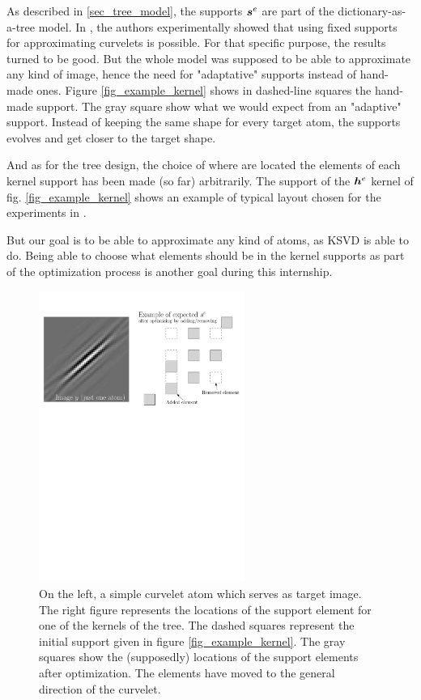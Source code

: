 As described in \ref{sec_tree_model}, the supports $\bm{s}^e$ are part of the dictionary-as-a-tree model. In \cite{chabiron_toward_2015}, the authors experimentally showed that using fixed supports for approximating curvelets is possible. For that specific purpose, the results turned to be good. But the whole model was supposed to be able to approximate any kind of image, hence the need for "adaptative" supports instead of hand-made ones. Figure \ref{fig_example_kernel} shows in dashed-line squares the hand-made support. The gray square show what we would expect from an "adaptive" support. Instead of keeping the same shape for every target atom, the supports evolves and get closer to the target shape.

And as for the tree design, the choice of where are located the elements of each kernel support has been made (so far) arbitrarily. The support of the $\bm{h}^e$ kernel of fig. \ref{fig_example_kernel} shows an example of typical layout chosen for the experiments in \cite{chabiron_optimization_2016}. 

But our goal is to be able to approximate any kind of atoms, as \ac{KSVD} is able to do. Being able to choose what elements should be in the kernel supports as part of the optimization process is another goal during this internship.

\begin{figure}[!ht] \centering
\includegraphics[width=0.6\textwidth]{figures/add-rm-elmts-support.pdf}
\caption{On the left, a simple curvelet atom which serves as target image. The right figure represents the locations of the support element for one of the kernels of the tree. The dashed squares represent the initial support given in figure \ref{fig_example_kernel}. The gray squares show the (supposedly) locations of the support elements after optimization. The elements have moved to the general direction of the curvelet.\label{fig_example_optimal_support}}
\end{figure}


